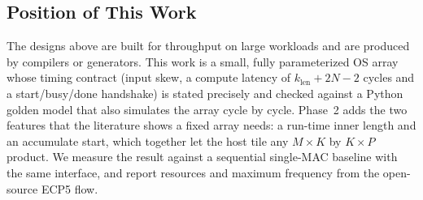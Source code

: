 \subsection{Position of This Work}
The designs above are built for throughput on large workloads and are produced by compilers or generators. This work is a small, fully parameterized OS array whose timing contract (input skew, a compute latency of $k_{\mathrm{len}} + 2N - 2$ cycles and a start/busy/done handshake) is stated precisely and checked against a Python golden model that also simulates the array cycle by cycle. Phase~2 adds the two features that the literature shows a fixed array needs: a run-time inner length and an accumulate start, which together let the host tile any $M \times K$ by $K \times P$ product. We measure the result against a sequential single-MAC baseline with the same interface, and report resources and maximum frequency from the open-source ECP5 flow.
